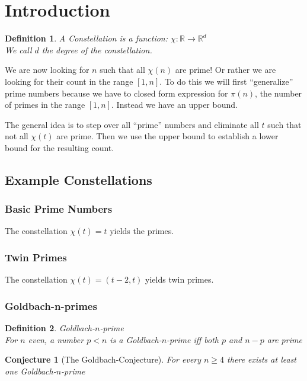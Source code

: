 \documentclass{article}
\title{\titlevar}
\author{\authorvar}
\date{\datevar}
\newtheorem{definition}{Definition}
\newtheorem{conjecture}{Conjecture}
\begin{document}
	\maketitle
	
	\section{Introduction}
	
	\begin{definition}
		A Constellation is a function: $χ: ℝ → ℝ^d$ \\
		We call $d$ the degree of the constellation.
	\end{definition}
	
	We are now looking for $n$ such that all $χ(n)$ are prime! Or rather we are looking for their count in the range $[1,n]$. To do this we will first \enquote{generalize} prime numbers because we have to closed form expression for $π(n)$, the number of primes in the range $[1,n]$. Instead we have an upper bound.

	\medskip
	
	The general idea is to step over all \enquote{prime} numbers and eliminate all $t$ such that not all $χ(t)$ are prime. Then we use the upper bound to establish a lower bound for the resulting count.
	
	\subsection{Example Constellations}
	
	\subsubsection{Basic Prime Numbers}
	
	The constellation $χ(t)= t$ yields the primes.
	
	\subsubsection{Twin Primes}
	
	The constellation $χ(t)= (t-2, t)$ yields twin primes.
	
	\subsubsection{Goldbach-n-primes}
	
	\begin{definition} Goldbach-$n$-prime \\
		For $n$ even, a number $p<n$ is a Goldbach-$n$-prime iff both $p$ and $n-p$ are prime
	\end{definition}
	\begin{conjecture}[The Goldbach-Conjecture]
		For every $n≥4$ there exists at least one Goldbach-$n$-prime
	\end{conjecture}
	
\end{document}
